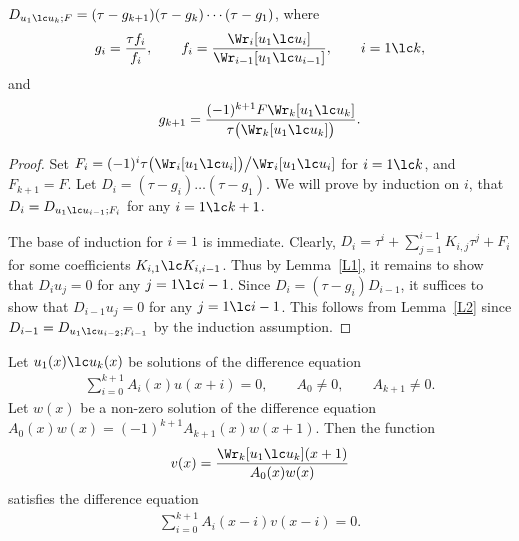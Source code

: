 \begin{lem} \label{L3}$ D_{u_1\lc u_k; F}=(\tau-g_{k+1}) (\tau-g_k) \cdots (\tau-g_1)$, where
\begin{gather*}
g_i = \frac{\tau f_i}{f_i},\qquad f_i = \frac{\Wr_i[u_1\lc u_i]}{\Wr_{i-1}[u_1\lc u_{i-1}]},
\qquad i=1\lc k,
\end{gather*}
and
\begin{gather*}
g_{k+1} = \frac{(-1)^{k+1}F\Wr_k[u_1\lc u_k]}
{\tau\bigl(\Wr_k[u_1\lc u_k]\bigr)}.
\end{gather*}
\end{lem}
\begin{proof}Set $F_i=(-1)^i \tau\bigl(\Wr_i[u_1\lc u_i]\bigr)\big/ \Wr_i[u_1\lc u_i]$ for $i=1\lc k$, and $F_{k+1}=F$. Let $D_i=(\tau-g_i) \dots (\tau-g_1)$. We will prove by induction on $i$, that $D_i=D_{u_1\lc u_{i-1}; F_i}$ for any $i=1\lc k+1$.

The base of induction for $i=1$ is immediate. Clearly, $D_i=\tau^i+\sum\limits_{j=1}^{i-1} K_{i,j} \tau^j+F_i$ for some coefficients $K_{i,1}\lc K_{i,i-1}$. Thus by Lemma~\ref{L1}, it remains to show that $D_iu_j=0$ for any $j=1\lc i-1$. Since $D_i=(\tau-g_i) D_{i-1}$, it suffices to show that $D_{i-1}u_j=0$ for any $j=1\lc i-1$. This follows from Lemma~\ref{L2} since $D_{i-1}=D_{u_1\lc u_{i-2}; F_{i-1}}$ by the induction assumption.
\end{proof}

\begin{lem}\label{L4} Let $u_1(x)\lc u_k(x)$ be solutions of the difference equation
\begin{gather}
\sum_{i=0}^{k+1} A_i(x) u(x+i) = 0,\qquad A_0\ne 0,\qquad A_{k+1}\ne 0.\label{e2}
\end{gather}
Let $w(x)$ be a non-zero solution of the difference equation $A_0(x) w(x)=(-1)^{k+1}A_{k+1}(x) w(x+1)$. Then the function
\begin{gather*}
v(x) = \frac{\Wr_k[u_1\lc u_k](x+1)}{A_0(x) w(x)}%
\end{gather*}
satisfies the difference equation
\begin{gather}
\sum_{i=0}^{k+1} A_i(x-i) v(x-i) = 0.\label{e4}
\end{gather}
\end{lem}

